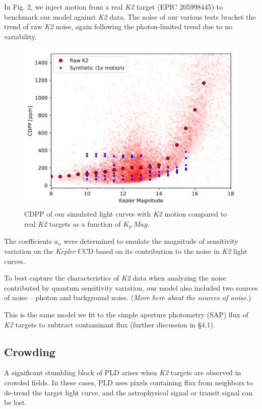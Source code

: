 \documentclass[12pt,preprint]{emulateapj}
\begin{document}
In Fig. 2, we inject motion from a real \textit{K2} target (EPIC 205998445) to benchmark our model against \textit{K2} data. The noise of our various tests bracket the trend of raw \textit{K2} noise, again following the photon-limited trend due to no variability.

\begin{figure}[h]
	\centering
	\includegraphics[width=1.0\linewidth]{1xmotion.png}
	\caption{CDPP of our simulated light curves with \textit{K2} motion compared to real \textit{K2} targets as a function of $K_p\ Mag$.}
	\label{fig:1motion}
\end{figure}

The coefficients $a_n$ were determined to emulate the magnitude of sensitivity variation on the \textit{Kepler} CCD based on its contribution to the noise in \textit{K2} light curves.

To best capture the characteristics of \textit{K2} data when analyzing the noise contributed by quantum sensitivity variation, our model also included two sources of noise -- photon and background noise. (\textit{More here about the sources of noise.})

This is the same model we fit to the simple aperture photometry (SAP) flux of \textit{K2} targets to subtract contaminant flux (further discussion in \S 4.1).

\subsection{Crowding}

A significant stumbling block of PLD arises when \textit{K2} targets are observed in crowded fields. In these cases, PLD uses pixels containing flux from neighbors to de-trend the target light curve, and the astrophysical signal or transit signal can be lost.
\end{document}
